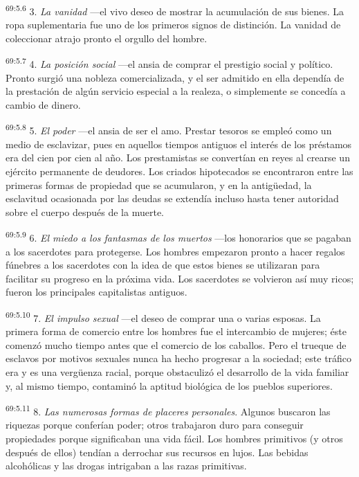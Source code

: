 \par
\textsuperscript{69:5.6} 3. \textit{La vanidad} ---el vivo deseo de mostrar la acumulación de sus bienes. La ropa suplementaria fue uno de los primeros signos de distinción. La vanidad de coleccionar atrajo pronto el orgullo del hombre.

\par
\textsuperscript{69:5.7} 4. \textit{La posición social} ---el ansia de comprar el prestigio social y político. Pronto surgió una nobleza comercializada, y el ser admitido en ella dependía de la prestación de algún servicio especial a la realeza, o simplemente se concedía a cambio de dinero.

\par
\textsuperscript{69:5.8} 5. \textit{El poder} ---el ansia de ser el amo. Prestar tesoros se empleó como un medio de esclavizar, pues en aquellos tiempos antiguos el interés de los préstamos era del cien por cien al año. Los prestamistas se convertían en reyes al crearse un ejército permanente de deudores. Los criados hipotecados se encontraron entre las primeras formas de propiedad que se acumularon, y en la antig\"uedad, la esclavitud ocasionada por las deudas se extendía incluso hasta tener autoridad sobre el cuerpo después de la muerte.

\par
\textsuperscript{69:5.9} 6. \textit{El miedo a los fantasmas de los muertos} ---los honorarios que se pagaban a los sacerdotes para protegerse. Los hombres empezaron pronto a hacer regalos fúnebres a los sacerdotes con la idea de que estos bienes se utilizaran para facilitar su progreso en la próxima vida. Los sacerdotes se volvieron así muy ricos; fueron los principales capitalistas antiguos.

\par
\textsuperscript{69:5.10} 7. \textit{El impulso sexual} ---el deseo de comprar una o varias esposas. La primera forma de comercio entre los hombres fue el intercambio de mujeres; éste comenzó mucho tiempo antes que el comercio de los caballos. Pero el trueque de esclavos por motivos sexuales nunca ha hecho progresar a la sociedad; este tráfico era y es una verg\"uenza racial, porque obstaculizó el desarrollo de la vida familiar y, al mismo tiempo, contaminó la aptitud biológica de los pueblos superiores.

\par
\textsuperscript{69:5.11} 8. \textit{Las numerosas formas de placeres personales}. Algunos buscaron las riquezas porque conferían poder; otros trabajaron duro para conseguir propiedades porque significaban una vida fácil. Los hombres primitivos (y otros después de ellos) tendían a derrochar sus recursos en lujos. Las bebidas alcohólicas y las drogas intrigaban a las razas primitivas.

